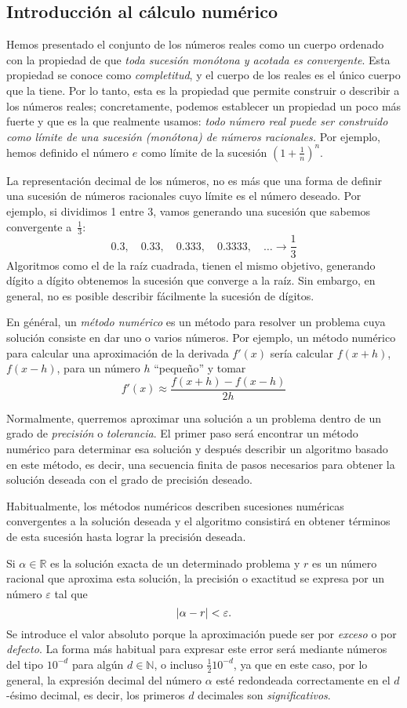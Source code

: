 \subsection{Introducción al cálculo numérico}

Hemos presentado el conjunto de los números reales como un cuerpo ordenado con la propiedad de que \emph{toda sucesión monótona y acotada es convergente}.
Esta propiedad se conoce como \emph{completitud}, y el cuerpo de los reales es el único cuerpo que la tiene.
Por lo tanto, esta es la propiedad que permite construir o describir a los números reales;
concretamente, podemos establecer un propiedad un poco más fuerte y que es la que realmente usamos: \emph{todo número real puede ser construido como límite de una sucesión (monótona) de números racionales.}
Por ejemplo, hemos definido el número $e$ como límite de la sucesión $(1+\frac1n)^n$.

La representación decimal de los números, no es más que una forma de definir una sucesión de números racionales cuyo límite es el número deseado. Por ejemplo, si dividimos 1 entre 3, vamos generando una sucesión que sabemos convergente a~$\frac13$:
\[
0.3,\quad 0.33,\quad 0.333,\quad 0.3333,\quad\dots \to \dfrac13
\]
Algoritmos como el de la raíz cuadrada, tienen el mismo objetivo, generando dígito a dígito obtenemos la sucesión que converge a la raíz.
Sin embargo, en general, no es posible describir fácilmente la sucesión de dígitos.

En général, un \emph{método numérico} es un método para resolver un problema cuya solución consiste en dar uno o varios números.
Por ejemplo, un método numérico para calcular una aproximación de la derivada $f'(x)$ sería calcular $f(x+h)$, $f(x-h)$, para un número $h$ ``pequeño'' y tomar
\[
f'(x)\approx \dfrac{f(x+h)-f(x-h)}{2h}
\]

Normalmente, querremos aproximar una solución a un problema dentro de un grado de \emph{precisión} o \emph{tolerancia}.
El primer paso será encontrar un método numérico para determinar esa solución y después describir un algoritmo basado en este método, es decir, una secuencia finita de pasos necesarios para obtener la solución deseada con el grado de precisión deseado.

Habitualmente, los métodos numéricos describen sucesiones numéricas convergentes a la solución deseada y el algoritmo consistirá en obtener términos de esta sucesión hasta lograr la precisión deseada.

Si $\alpha\in\mathbb{R}$ es la solución exacta de un determinado problema y $r$ es un número racional que aproxima esta solución, la precisión o exactitud se expresa por un número $\varepsilon$ tal que
\[
|\alpha-r|< \varepsilon.
\]
Se introduce el valor absoluto porque la aproximación puede ser por \emph{exceso} o por \emph{defecto}.
La forma más habitual para expresar este error será mediante números del tipo $10^{-\mathit d}$ para algún
$\mathit d\in\mathbb{N}$, o incluso $\frac1210^{-\mathit{d}}$, ya que en este caso, por lo general, 
la expresión decimal del número $\alpha$ esté redondeada correctamente
en el $\mathit{d}$-ésimo decimal, es decir, los primeros $\mathit{d}$ decimales son \emph{significativos}.

